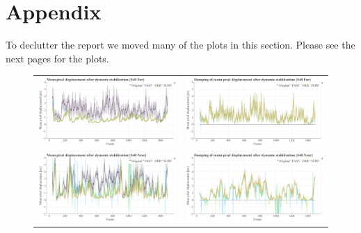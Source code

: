 
\newpage

\section{Appendix}
\label{sec:appendix}
To declutter the report we moved many of the plots in this section.
Please see the next pages for the plots.

\begin{figure}[!ht]
  \centering
    \begin{tabular}{cc}
      \includegraphics[width=0.475\linewidth]{diagrams/optical_flow/s40_n_far_image_raw.mp4.csv/compare_of_mean_pixel_displacement/window_size_12.html.png}    &  
      \includegraphics[width=0.475\linewidth]{diagrams/optical_flow/s40_n_far_image_raw.mp4.csv/deltas_of_mean_pixel_displacement/window_size_12.html.png}   \\ 

      \includegraphics[width=0.475\linewidth]{diagrams/optical_flow/s40_n_near_image_raw.mp4.csv/compare_of_mean_pixel_displacement/window_size_12.html.png}    & 
      \includegraphics[width=0.475\linewidth]{diagrams/optical_flow/s40_n_near_image_raw.mp4.csv/deltas_of_mean_pixel_displacement/window_size_12.html.png}   \\ 


\end{tabular}
\end{figure}
